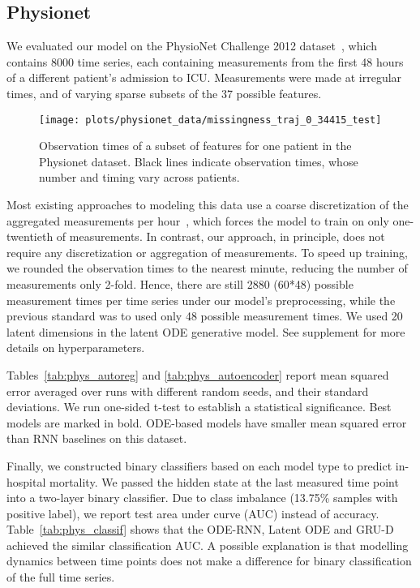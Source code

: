 \documentclass{article}
\begin{document}
\subsection{Physionet}
\label{sec:phys}



We evaluated our model on the PhysioNet Challenge 2012 dataset~\citep{Silva2012}, which contains 8000 time series, each containing measurements from the first 48 hours of a different patient's admission to ICU.
Measurements were made at irregular times, and of varying sparse subsets of the 37 possible features.

\begin{figure}[h]
	\centering
    \texttt{[image: plots/physionet\_data/missingness\_traj\_0\_34415\_test]}
    \caption{Observation times of a subset of features for one patient in the Physionet dataset.
    Black lines indicate observation times, whose number and timing vary across patients.}
    \label{fig:phys}
\end{figure}

Most existing approaches to modeling this data use a coarse discretization of the aggregated measurements per hour~\citep{che_sontag_2018}, which forces the model to train on only one-twentieth of measurements.
In contrast, our approach, in principle, does not require any discretization or aggregation of measurements.
To speed up training, we rounded the observation times to the nearest minute, reducing the number of measurements only 2-fold.
Hence, there are still 2880 (60*48) possible measurement times per time series under our model's preprocessing, while the previous standard was to used only 48 possible measurement times.
We used 20 latent dimensions in the latent ODE generative model. See supplement for more details on hyperparameters.



Tables~\ref{tab:phys_autoreg} and \ref{tab:phys_autoencoder} report mean squared error averaged over runs with different random seeds, and their standard deviations. We run one-sided t-test to establish a statistical significance. Best models are marked in bold. ODE-based models have smaller mean squared error than RNN baselines on this dataset.



Finally, we constructed binary classifiers based on each model type to predict in-hospital mortality.
We passed the hidden state at the last measured time point into a two-layer binary classifier.
Due to class imbalance (13.75\% samples with positive label), we report test area under curve (AUC) instead of accuracy.
Table~\ref{tab:phys_classif} shows that the ODE-RNN, Latent ODE and GRU-D achieved the similar classification AUC.
A possible explanation is that modelling dynamics between time points does not make a difference for binary classification of the full time series.
\end{document}

